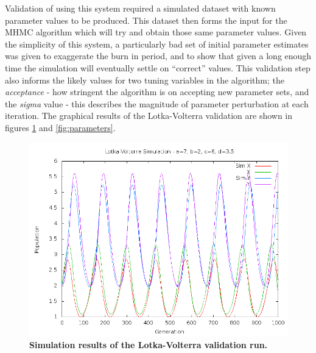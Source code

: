 Validation of using this system required a simulated dataset with known parameter values to be produced. This dataset then forms the input for the MHMC algorithm which will try and obtain those same parameter values. Given the simplicity of this system, a particularly bad set of initial parameter estimates was given to exaggerate the burn in period, and to show that given a long enough time the simulation will eventually settle on ``correct'' values. This validation step also informs the likely values for two tuning variables in the algorithm; the \textit{acceptance} - how stringent the algorithm is on accepting new parameter sets, and the \textit{sigma} value - this describes the magnitude of parameter perturbation at each iteration.
The graphical results of the Lotka-Volterra validation are shown in figures \ref{fig:simulation} and \ref{fig:parameters}.

\begin{figure}
 \centering
 \includegraphics[width=14cm]{./03-parameterestimationmethodologies/data/Simulation.png}
 \caption{{\bf Simulation results of the Lotka-Volterra validation run.}
 \label{fig:simulation}}

\end{figure}

